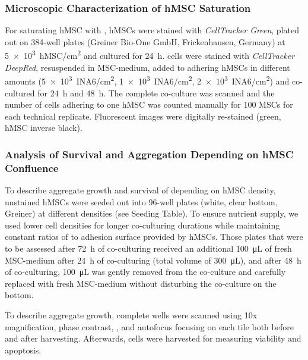\subsubsection*{Microscopic Characterization of hMSC Saturation}
For saturating hMSC with \INA, hMSCs were stained with \textit{CellTracker
    Green}, plated out on 384-well plates (Greiner Bio-One GmbH, Frickenhausen,
Germany) at \SI{5e3}{hMSC/cm^2} and cultured for \SI{24}{\hour}. \INA cells
were stained with \textit{CellTracker DeepRed}, resuspended in MSC-medium, added
to adhering hMSCs in different amounts (\SI{5e3}{INA6/cm^2},
\SI{1e3}{INA6/cm^2}, \SI{2e3}{INA6/cm^2}) and co-cultured for \SI{24}{\hour} and
\SI{48}{\hour}. The complete co-culture was scanned and the number of \INA
cells adhering to one hMSC was counted manually for 100 MSCs for each technical
replicate. Fluorescent images were digitally re-stained (\INA green, hMSC
inverse black).


\subsubsection*{Analysis of \INA Survival and Aggregation Depending on hMSC Confluence}
To describe aggregate growth and survival of \INA depending on hMSC density,
unstained hMSCs were seeded out into 96-well plates (white, clear bottom,
Greiner) at different densities (see Seeding Table). To ensure nutrient supply,
we used lower cell densities for longer co-culturing durations while maintaining
constant ratios of \INA to adhesion surface provided by hMSCs. Those plates
that were to be assessed after \SI{72}{\hour} of co-culturing received an
additional \SI{100}{\micro\liter} of fresh MSC-medium after \SI{24}{\hour} of
co-culturing (total volume of \SI{300}{\micro\liter}), and after \SI{48}{\hour}
of co-culturing, \SI{100}{\micro\liter} was gently removed from the co-culture
and carefully replaced with fresh MSC-medium without disturbing the co-culture
on the bottom.

To describe aggregate growth, complete wells were scanned using
10x magnification, phase contrast, , and autofocus
focusing on each tile both before and after harvesting. Afterwards, \INA cells
were harvested for measuring viability and apoptosis.



